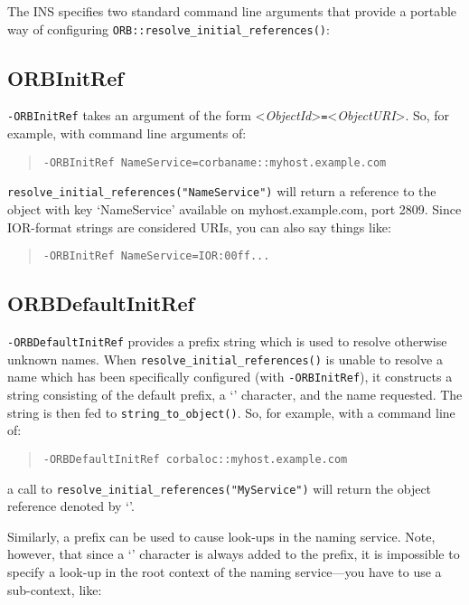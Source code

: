 \documentclass[11pt,oneside,a4paper]{book}
\newcommand{\code}[1]{\texttt{#1}}
\newcommand{\op}[1]{\texttt{#1()}}
\newcommand{\cmdline}[1]{\texttt{#1}}
\begin{document}
The INS specifies two standard command line arguments that provide a
portable way of configuring \op{ORB::resolve\_initial\_references}:


\subsection{ORBInitRef}

\cmdline{-ORBInitRef} takes an argument of the form
<\textit{ObjectId}>\cmdline{=}<\textit{ObjectURI}>. So, for example,
with command line arguments of:

\begin{quote}
\cmdline{-ORBInitRef NameService=corbaname::myhost.example.com}
\end{quote}

\noindent \code{resolve\_initial\_references("NameService")} will
return a reference to the object with key `NameService' available on
myhost.example.com, port 2809. Since IOR-format strings are considered
URIs, you can also say things like:

\begin{quote}
\cmdline{-ORBInitRef NameService=IOR:00ff...}
\end{quote}


\subsection{ORBDefaultInitRef}

\cmdline{-ORBDefaultInitRef} provides a prefix string which is used to
resolve otherwise unknown names. When
\op{resolve\_initial\_references} is unable to resolve a name which
has been specifically configured (with \cmdline{-ORBInitRef}), it
constructs a string consisting of the default prefix, a `\corbauri{/}'
character, and the name requested.  The string is then fed to
\op{string\_to\_object}. So, for example, with a command line of:

\begin{quote}
\cmdline{-ORBDefaultInitRef corbaloc::myhost.example.com}
\end{quote}

\noindent a call to \code{resolve\_initial\_references("MyService")}
will return the object reference denoted by
`'.

Similarly, a  prefix can be used to cause
look-ups in the naming service. Note, however, that since a
`\corbauri{/}' character is always added to the prefix, it is
impossible to specify a look-up in the root context of the naming
service---you have to use a sub-context, like:
\end{document}
